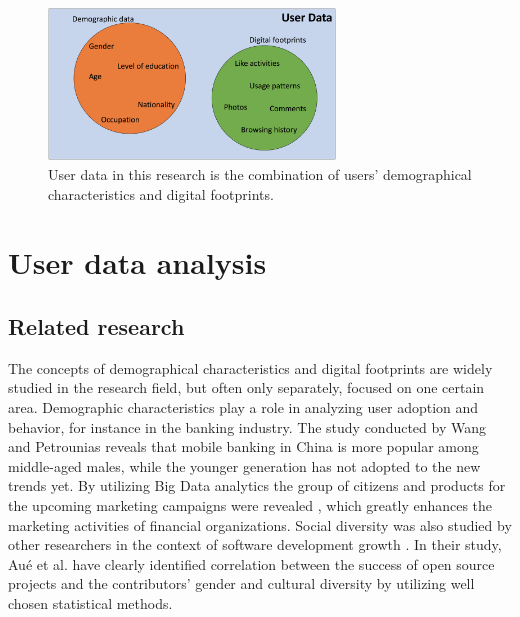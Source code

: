 \documentclass[conference]{IEEEtran}
\begin{document}
\begin{figure}[h] 
  \begin{center}
    \includegraphics[width=3in]{Images/user_data_venn.png}
    \caption{User data in this research is the combination of users' demographical characteristics and digital footprints.}
    \label{user_data_venn}
  \end{center}
\end{figure}

\section{User data analysis}
\subsection{Related research}
The concepts of demographical characteristics and digital footprints are widely studied in the research field, but often only separately, focused on one certain area. Demographic characteristics play a role in analyzing user adoption and behavior, for instance in the banking industry. The study conducted by Wang and Petrounias \cite{chinesemobilebankingusers} reveals that mobile banking in China is more popular among middle-aged males, while the younger generation has not adopted to the new trends yet. By utilizing Big Data analytics the group of citizens and products for the upcoming marketing campaigns were revealed \cite{chinesemobilebankingusers}, which greatly enhances the marketing activities of financial organizations. Social diversity was also studied by other researchers in the context of software development growth \cite{socialdiversityongithub}. In their study, Aué et al. \cite{socialdiversityongithub} have clearly identified correlation between the success of open source projects and the contributors' gender and cultural diversity by utilizing well chosen statistical methods. 
\end{document}
